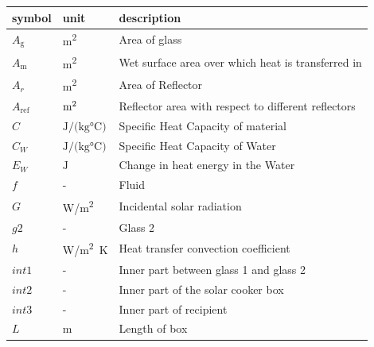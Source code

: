 \documentclass[12pt]{article}
\begin{document}
\renewcommand{\arraystretch}{1.2}
\noindent \begin{longtable*}{l l p{12cm}} \toprule
\textbf{symbol} & \textbf{unit} & \textbf{description}\\
\midrule 

$A_\text{g}$ & \si[per-mode=symbol] {\square\metre} & Area of glass
\\ 

$A_\text{m}$ & \si[per-mode=symbol] {\square\metre} & Wet surface area over which heat is transferred in
\\ 

$A_r$ & \si[per-mode=symbol] {\square\metre} & Area of Reflector
\\



$A_\text{ref}$ & $\si[per-mode=symbol] {\square\metre} $ & Reflector area with respect to different reflectors \\

$C$ & $\si{\joule\per(\kilogram \celsius)}$ & Specific Heat Capacity of material \\

$C_W$ & $\si{\joule\per(\kilogram \celsius)}$ & Specific Heat Capacity of Water \\

$E_W$ & $\si{\joule}$ & Change in heat energy in the Water \\

$f$ & - & Fluid \\

$G$ & \si[per-mode=symbol]{\watt\per\square\metre} & Incidental solar radiation \\

$g2$ & - & Glass 2 \\

$h$ & \si[per-mode=symbol]{\watt\per\square\metre K} & Heat transfer convection coefficient \\

$int1$ & - & Inner part between glass 1 and glass 2 \\

$int2$ & - & Inner part of the solar cooker box \\

$int3$ & - & Inner part of recipient \\

$L$ & \si{\metre} & Length of box \\


\end{longtable*}
\end{document}

